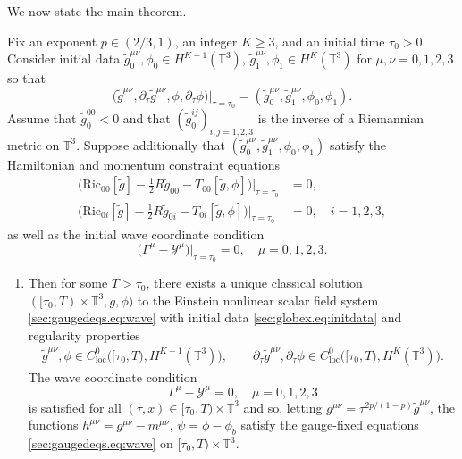 \documentclass{article}
\newcommand{\TT}{\mathbb{T}}
\newcommand{\Ric}{\mathrm{Ric}}
\newcommand{\mc}{\mathcal}
\newcommand{\wt}{\widetilde}
\newcommand{\pa}{\partial}
\begin{document}
We now state the main theorem.
\begin{theorem}\label{sec:globex.thm:globalexistence}
    Fix an exponent $p \in (2/3,1)$, an integer $K \geq 3$, and an initial time $\tau_0 > 0$. Consider initial data $\wt{g}_0^{\mu\nu}, \phi_0 \in H^{K+1}(\TT^3)$, $\wt{g}_1^{\mu\nu}, \phi_1 \in H^K(\TT^3)$ for $\mu,\nu=0,1,2,3$ so that
    \begin{equation}\label{sec:globex.eq:initdata}
        \big(\wt{g}^{\mu\nu},\pa_\tau \wt{g}^{\mu\nu},\phi,\pa_\tau \phi \big)\Big|_{\tau = \tau_0} = (\wt{g}_0^{\mu\nu},\wt{g}_1^{\mu\nu},\phi_0,\phi_1).
    \end{equation}
    Assume that $\wt{g}_0^{00} < 0$ and that $(\wt{g}_0^{ij})_{i,j=1,2,3}$ is the inverse of a Riemannian metric on $\TT^3$. Suppose additionally that $(\wt{g}_0^{\mu\nu},\wt{g}_1^{\mu\nu},\phi_0,\phi_1)$ satisfy the Hamiltonian and momentum constraint equations
    \begin{subequations}
        \begin{align}
            \Big(\Ric_{00}[\wt{g}]- \frac{1}{2}R\wt{g}_{00} - T_{00}[\wt{g},\phi]\Big)\Big|_{\tau = \tau_0} &=0,\\
            \Big(\Ric_{0i}[\wt{g}]- \frac{1}{2}R\wt{g}_{0i} - T_{0i}[\wt{g},\phi]\Big)\Big|_{\tau = \tau_0} &=0,\quad i=1,2,3,
        \end{align}
    \end{subequations}
    as well as the initial wave coordinate condition
    \begin{equation}
        \big(\Gamma^\mu - \mc{Y}^\mu\big)\Big|_{\tau = \tau_0} = 0,\quad \mu=0,1,2,3.
    \end{equation}
    \begin{enumerate}
        \item Then for some $T > \tau_0$, there exists a unique classical solution $([\tau_0,T)\times \TT^3,g,\phi)$ to the Einstein nonlinear scalar field system \eqref{sec:gaugedeqs.eq:wave} with initial data \eqref{sec:globex.eq:initdata} and regularity properties
        \begin{gather}
            \wt{g}^{\mu\nu},\phi \in C_{\mathrm{loc}}^0\big([\tau_0,T), H^{K+1}(\TT^3)\big), \qquad
            \pa_\tau \wt{g}^{\mu\nu}, \pa_\tau \phi \in C_{\mathrm{loc}}^0\big([\tau_0,T), H^{K}(\TT^3)\big).
        \end{gather}
        The wave coordinate condition
        \begin{equation}\label{sec:globex.eq:wavecoord}
            \Gamma^\mu- \mc{Y}^\mu= 0,\quad \mu=0,1,2,3
        \end{equation}
        is satisfied for all $(\tau,x) \in [\tau_0,T)\times\TT^3$ and so, letting $g^{\mu\nu} = \tau^{2p/(1-p)}\wt{g}^{\mu\nu}$, the functions
        $h^{\mu\nu} = g^{\mu\nu}-m^{\mu\nu}$, $\psi = \phi-\phi_b$ satisfy the gauge-fixed equations \eqref{sec:gaugedeqs.eq:wave} on $[\tau_0,T)\times\TT^3$.
        

\end{enumerate}
\end{theorem}
\end{document}
